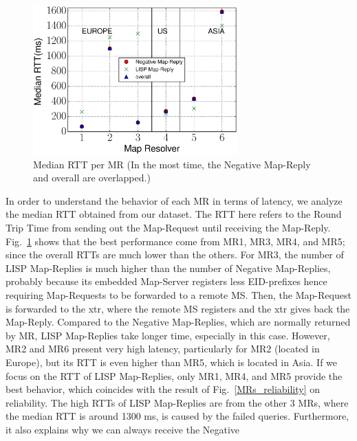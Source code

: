 \begin{figure}[!t]
	\centering
	\includegraphics[width=0.7\textwidth]{Pics/median_of_RTT.eps}
	\caption{Median RTT per MR (In the most time, the Negative Map-Reply and overall are overlapped.)}
	\label{median_rtt_per_map-resolver}
\end{figure}
In order to understand the behavior of each MR in terms of latency, we analyze
the median RTT obtained from our dataset. The RTT here refers to the Round Trip
Time from sending out the Map-Request until receiving the Map-Reply.
Fig.~\ref{median_rtt_per_map-resolver} shows that the best performance come
from MR1, MR3, MR4, and MR5; since the overall RTTs are much lower than
the others.  For MR3, the number of LISP Map-Replies is much higher than the
number of Negative Map-Replies, probably because its embedded Map-Server
registers less EID-prefixes hence requiring Map-Requests to be forwarded to a
remote MS. Then, the Map-Request is forwarded to the \acrshort{xtr}, where the remote MS
registers and the \acrshort{xtr} gives back the Map-Reply. Compared to the Negative
Map-Replies, which are normally returned by MR, LISP Map-Replies take longer
time, especially in this case. However, MR2 and MR6 present very high
latency, particularly for MR2 (located in Europe), but its RTT is even higher
than MR5, which is located in Asia. %
If we focus on the RTT of LISP Map-Replies, only MR1, MR4, and MR5 provide the best
behavior, which coincides with the result of Fig.~\ref{MRs_reliability} on
reliability. The high RTTs of LISP Map-Replies are from the other 3 MRs,
where the median RTT is around 1300 ms, is caused by the failed queries.
Furthermore, it also explains why we can always receive the Negative

